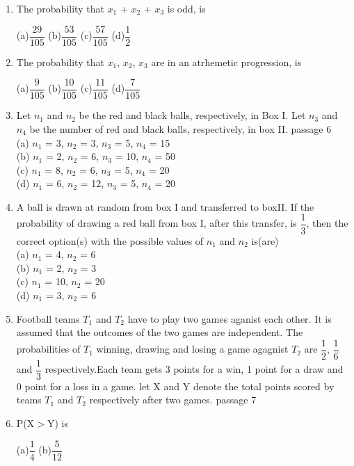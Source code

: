 \documentclass[journal,12pt,twocolumn]{IEEEtran}
\begin{document}
\begin{enumerate}[label=\arabic*]
	\item The probability that $x_1$ + $x_2$ + $x_3$ is odd, is
	\begin{multicols}{4}
	(a)$\dfrac{29}{105}$   
	(b)$\dfrac{53}{105}$  
	(c)$\dfrac{57}{105}$  
	(d)$\dfrac{1}{2}$
	\end{multicols}
	\item The probability that $x_1$, $x_2$, $x_3$ are in an atrhemetic progression, is
	\begin{multicols}{4}
	(a)$\dfrac{9}{105}$ 
	(b)$\dfrac{10}{105}$   
	(c)$\dfrac{11}{105}$   
	(d)$\dfrac{7}{105}$
	\end{multicols}
	\item Let $n_1$ and $n_2$ be the red and black balls, respectively, in Box I. Let $n_3$ and $n_4$ be the number of red and black balls, respectively, in box II.   passage 6\\
	(a)   $n_1$ = 3, $n_2$ = 3, $n_3$ = 5, $n_4$ = 15\\
	(b)   $n_1$ = 2, $n_2$ = 6, $n_3$ = 10, $n_4$ = 50\\
	(c)   $n_1$ = 8, $n_2$ = 6, $n_3$ = 5, $n_4$ = 20\\
	(d)   $n_1$ = 6, $n_2$ = 12, $n_3$ = 5, $n_4$ = 20\\
	\item A ball is drawn at random from box I and transferred to boxII. If the probability of drawing a red ball from box I, after this transfer, is $\dfrac{1}{3}$, then the correct option(s) with the possible values of $n_1$ and $n_2$ is(are)\\
	(a)   $n_1$ = 4, $n_2$ = 6\\
	(b)   $n_1$ = 2, $n_2$ = 3\\
	(c)   $n_1$ = 10, $n_2$ = 20\\
	(d)   $n_1$ = 3, $n_2$ = 6\\
	\item Football teams $T_1$ and $T_2$ have to play two games aganist each other. It is assumed that the outcomes of the two games are independent. The probabilities of $T_1$ winning, drawing and losing a game agagnist $T_2$ are $\dfrac{1}{2}$, $\dfrac{1}{6}$ and $\dfrac{1}{3}$ respectively.Each team gets 3 points for a win, 1 point for a draw and 0 point for a loss in a game. let X and Y denote the total points scored by teams $T_1$ and $T_2$ respectively after two games.   passage 7\\
	\item P(X$>$Y) is 
	\begin{multicols}{4}
	(a)$\dfrac{1}{4}$  
	(b)$\dfrac{5}{12}$   

\end{multicols}
\end{enumerate}
\end{document}
